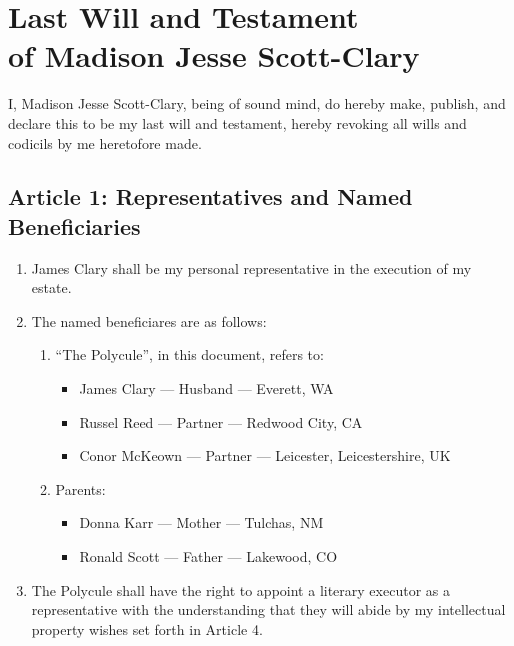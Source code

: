 \documentclass[oneside]{memoir}
\begin{document}
\section*{\Huge Last Will and Testament\\ of Madison Jesse Scott-Clary}\label{last-will-and-testament-of-madison-jesse-scott-clary}

I, Madison Jesse Scott-Clary, being of sound mind, do hereby make, publish, and declare this to be my last will and testament, hereby revoking all wills and codicils by me heretofore made.

\subsection*{Article 1: Representatives and Named Beneficiaries}\label{article-1-representatives-and-named-beneficiaries}

\begin{enumerate}
\def\labelenumi{\arabic{enumi}.}
\tightlist
\item
  James Clary shall be my personal representative in the execution of my estate.
\item
  The named beneficiares are as follows:

  \begin{enumerate}
  \def\labelenumii{\arabic{enumii}.}
  \tightlist
  \item
    ``The Polycule'', in this document, refers to:

    \begin{itemize}
    \tightlist
    \item
      James Clary --- Husband --- Everett, WA
    \item
      Russel Reed --- Partner --- Redwood City, CA
    \item
      Conor McKeown --- Partner --- Leicester, Leicestershire, UK
    \end{itemize}
  \item
    Parents:

    \begin{itemize}
    \tightlist
    \item
      Donna Karr --- Mother --- Tulchas, NM
    \item
      Ronald Scott --- Father --- Lakewood, CO
    \end{itemize}
  \end{enumerate}
\item
  The Polycule shall have the right to appoint a literary executor as a representative with the understanding that they will abide by my intellectual property wishes set forth in Article 4.
\end{enumerate}
\end{document}

